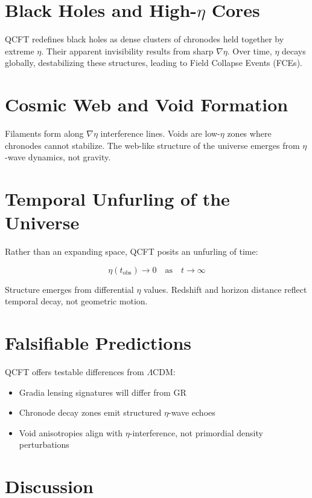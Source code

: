 \documentclass[12pt]{article}
\begin{document}
\section{Black Holes and High-$\eta$ Cores}

QCFT redefines black holes as dense clusters of chronodes held together by extreme $\eta$. Their apparent invisibility results from sharp $\nabla \eta$. Over time, $\eta$ decays globally, destabilizing these structures, leading to Field Collapse Events (FCEs).

\section{Cosmic Web and Void Formation}

Filaments form along $\nabla \eta$ interference lines. Voids are low-$\eta$ zones where chronodes cannot stabilize. The web-like structure of the universe emerges from $\eta$-wave dynamics, not gravity.

\section{Temporal Unfurling of the Universe}

Rather than an expanding space, QCFT posits an unfurling of time:

\[
\eta(t_{\text{obs}}) \rightarrow 0 \quad \text{as} \quad t \rightarrow \infty
\]

Structure emerges from differential $\eta$ values. Redshift and horizon distance reflect temporal decay, not geometric motion.

\section{Falsifiable Predictions}

QCFT offers testable differences from $\Lambda$CDM:

\begin{itemize}
    \item Gradia lensing signatures will differ from GR
    \item Chronode decay zones emit structured $\eta$-wave echoes
    \item Void anisotropies align with $\eta$-interference, not primordial density perturbations
\end{itemize}

\section{Discussion}
\end{document}
